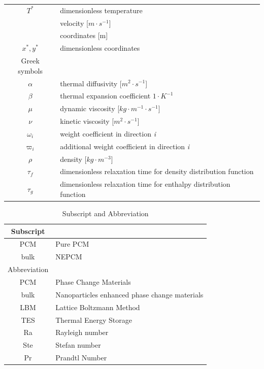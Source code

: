\documentclass[preprint,12pt]{elsarticle}
\begin{document}
\begin{table}[H]
\begin{tabular}{cl}
	$ 	T^{*} $& dimensionless temperature    \\
	\text{u}& velocity [$ m\cdot s^{-1} $]   \\
	\text{x , y}& coordinates [m]   \\
	\textit{$ x^*,y^* $}& dimensionless coordinates    \\
\midrule
Greek symbols  &   \\
\midrule
	$ \alpha $   & thermal diffusivity  [$ m^{2} \cdot  s^{-1} $]   \\
	 $\beta$& thermal expansion coefficient $ 1\cdot K^{-1} $   \\
	 $ \mu $& dynamic viscosity [$ kg\cdot m^{-1}\cdot s^{-1} $]    \\
	 $ \nu $& kinetic viscosity [$ m^{2} \cdot  s^{-1} $] \\
	 $\omega_i$& weight coefficient in direction \textit{i}	\\				
	 $ \varpi _i $& additional weight coefficient in direction   \textit{i}  \\
	$\rho$& density  [$ kg\cdot m^{-3} $]  \\
	$ \tau _f $& dimensionless relaxation time for density distribution function    \\
$ \tau _g $& dimensionless relaxation time for enthalpy distribution function  \\		
	\toprule
	\end{tabular}
\label{add}
\end{table}	\begin{table}[H]
\centering
\footnotesize
\caption{	Subscript and Abbreviation}
\begin{tabular}{cl}
	\toprule
		Subscript   &    \\
		\midrule
PCM  & Pure PCM    \\
bulk & NEPCM   \\
\midrule
Abbreviation   &    \\
\midrule
PCM  & Phase Change Materials    \\
bulk & Nanoparticles enhanced phase change materials   \\
LBM & Lattice Boltzmann Method   \\
TES & Thermal Energy Storage   \\
Ra & Rayleigh number   \\
Ste & Stefan number   \\
Pr & Prandtl Number   \\
	\bottomrule
\end{tabular}
\label{addd}		
\end{table}
	
\end{document}
